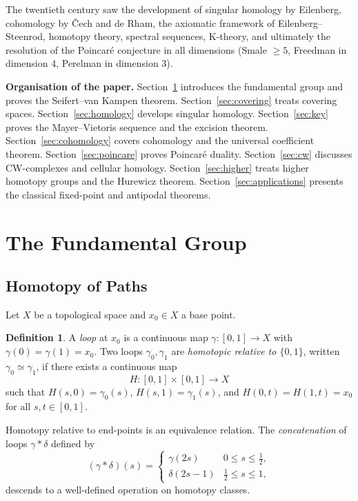 \documentclass[12pt,a4paper]{amsart}
\theoremstyle{definition}
\newtheorem{definition}[theorem]{Definition}
\begin{document}
The twentieth century saw the development of singular homology by Eilenberg,
cohomology by \v{C}ech and de Rham, the axiomatic framework of Eilenberg--Steenrod,
homotopy theory, spectral sequences, K-theory, and ultimately the resolution of the
Poincar\'e conjecture in all dimensions (Smale $\geq 5$, Freedman in dimension 4,
Perelman in dimension 3).

\medskip\noindent\textbf{Organisation of the paper.}
Section~\ref{sec:fundamental} introduces the fundamental group and proves the
Seifert--van Kampen theorem. Section~\ref{sec:covering} treats covering spaces.
Section~\ref{sec:homology} develops singular homology. Section~\ref{sec:key}
proves the Mayer--Vietoris sequence and the excision theorem.
Section~\ref{sec:cohomology} covers cohomology and the universal coefficient theorem.
Section~\ref{sec:poincare} proves Poincar\'e duality.
Section~\ref{sec:cw} discusses CW-complexes and cellular homology.
Section~\ref{sec:higher} treats higher homotopy groups and the Hurewicz theorem.
Section~\ref{sec:applications} presents the classical fixed-point and
antipodal theorems.

\section{The Fundamental Group}
\label{sec:fundamental}

\subsection{Homotopy of Paths}

Let $X$ be a topological space and $x_0 \in X$ a base point.

\begin{definition}
A \emph{loop} at $x_0$ is a continuous map $\gamma\colon [0,1] \to X$ with
$\gamma(0) = \gamma(1) = x_0$. Two loops $\gamma_0, \gamma_1$ are
\emph{homotopic relative to $\{0,1\}$}, written $\gamma_0 \simeq \gamma_1$,
if there exists a continuous map
\[
  H\colon [0,1] \times [0,1] \to X
\]
such that $H(s,0) = \gamma_0(s)$, $H(s,1) = \gamma_1(s)$, and
$H(0,t) = H(1,t) = x_0$ for all $s, t \in [0,1]$.
\end{definition}

Homotopy relative to end-points is an equivalence relation. The
\emph{concatenation} of loops $\gamma * \delta$ defined by
\[
  (\gamma * \delta)(s) = \begin{cases}
    \gamma(2s) & 0 \leq s \leq \tfrac{1}{2}, \\
    \delta(2s-1) & \tfrac{1}{2} \leq s \leq 1,
  \end{cases}
\]
descends to a well-defined operation on homotopy classes.
\end{document}
